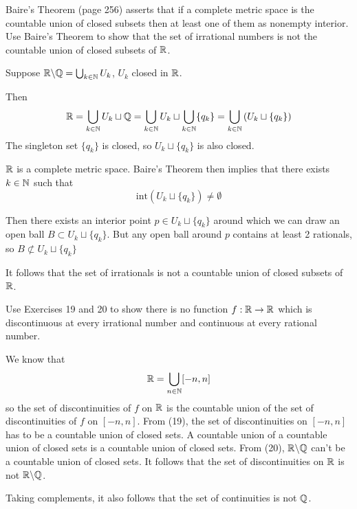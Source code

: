 \documentclass[a4paper, 12pt]{article}
\begin{document}
\begin{problem} [3.20*]
Baire's Theorem (page 256) asserts that if a complete metric space is the countable union of closed subsets then at least one of them as nonempty interior. Use Baire's Theorem to show that the set of irrational numbers is not the countable union of closed subsets of $\mathbb{R}$.
\end{problem}
\begin{solution}
    Suppose $\mathbb{R} \backslash \mathbb{Q} = \bigcup_{k \in \mathbb{N}} U_k$, $U_k$ closed in $\mathbb{R}$.

    Then \[
        \mathbb{R} = \bigcup_{k \in \mathbb{N}}U_k \sqcup \mathbb{Q} = \bigcup_{k \in \mathbb{N}}U_k \sqcup \bigcup_{k \in \mathbb{N}} \{q_k\} = \bigcup_{k \in \mathbb{N}} \left(U_k \sqcup \{q_k\} \right)
    \]
    The singleton set $\{q_k\}$ is closed, so $U_k \sqcup \{q_k\}$ is also closed.

    $\mathbb{R}$ is a complete metric space. Baire's Theorem then implies that there exists $k \in \mathbb{N}$ such that \[
        \mathrm{int}(U_k \sqcup \{q_k\}) \neq \emptyset
    \]

    Then there exists an interior point $p \in U_k \sqcup \{q_k\}$ around which we can draw an open ball $B \subset U_k \sqcup \{q_k\}$. But any open ball around $p$ contains at least 2 rationals, so $B \not \subset U_k \sqcup \{q_k\}$ \contra

    It follows that the set of irrationals is not a countable union of closed subsets of $\mathbb{R}$.
\end{solution}

\begin{problem} [3.21]
Use Exercises 19 and 20 to show there is no function $f: \mathbb{R} \to \mathbb{R}$ which is discontinuous at every irrational number and continuous at every rational number.
\end{problem}
\begin{solution}
    We know that \[
        \mathbb{R} = \bigcup_{n \in \mathbb{N}}[-n, n]
    \]
    so the set of discontinuities of $f$ on $\mathbb{R}$ is the countable union of the set of discontinuities of $f$ on $[-n, n]$. From (19), the set of discontinuities on $[-n, n]$ has to be a countable union of closed sets. A countable union of a countable union of closed sets is a countable union of closed sets. From (20), $\mathbb{R} \backslash \mathbb{Q}$ can't be a countable union of closed sets. It follows that the set of discontinuities on $\mathbb{R}$ is not $\mathbb{R} \backslash \mathbb{Q}$.

    Taking complements, it also follows that the set of continuities is not $\mathbb{Q}$.
\end{solution}
\end{document}

